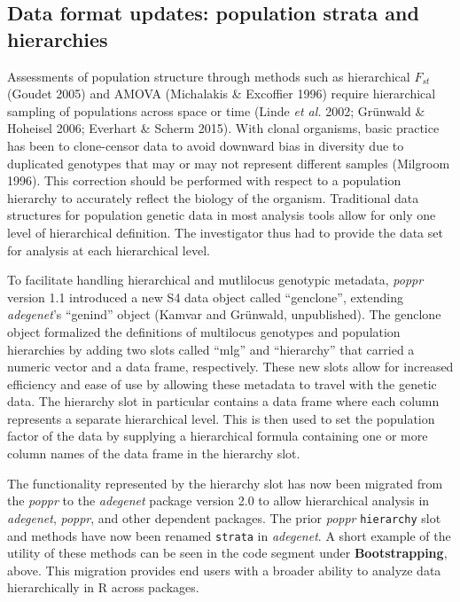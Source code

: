\documentclass[double,12pt]{beavtex}
\begin{document}
  \subsection{Data format updates: population strata and
  hierarchies}\label{data-format-updates-population-strata-and-hierarchies}
  
  Assessments of population structure through methods such as hierarchical
  \(F_{st}\) (Goudet 2005) and AMOVA (Michalakis \& Excoffier 1996)
  require hierarchical sampling of populations across space or time (Linde
  \emph{et al.} 2002; Grünwald \& Hoheisel 2006; Everhart \& Scherm 2015).
  With clonal organisms, basic practice has been to clone-censor data to
  avoid downward bias in diversity due to duplicated genotypes that may or
  may not represent different samples (Milgroom 1996). This correction
  should be performed with respect to a population hierarchy to accurately
  reflect the biology of the organism. Traditional data structures for
  population genetic data in most analysis tools allow for only one level
  of hierarchical definition. The investigator thus had to provide the
  data set for analysis at each hierarchical level.
  
  To facilitate handling hierarchical and mutlilocus genotypic metadata,
  \emph{poppr} version 1.1 introduced a new S4 data object called
  ``genclone'', extending \emph{adegenet}'s ``genind'' object (Kamvar and
  Grünwald, unpublished). The genclone object formalized the definitions
  of multilocus genotypes and population hierarchies by adding two slots
  called ``mlg'' and ``hierarchy'' that carried a numeric vector and a
  data frame, respectively. These new slots allow for increased efficiency
  and ease of use by allowing these metadata to travel with the genetic
  data. The hierarchy slot in particular contains a data frame where each
  column represents a separate hierarchical level. This is then used to
  set the population factor of the data by supplying a hierarchical
  formula containing one or more column names of the data frame in the
  hierarchy slot.
  
  The functionality represented by the hierarchy slot has now been
  migrated from the \emph{poppr} to the \emph{adegenet} package version
  2.0 to allow hierarchical analysis in \emph{adegenet}, \emph{poppr}, and
  other dependent packages. The prior \emph{poppr} \texttt{hierarchy} slot
  and methods have now been renamed \texttt{strata} in \emph{adegenet}. A
  short example of the utility of these methods can be seen in the code
  segment under \textbf{Bootstrapping}, above. This migration provides end
  users with a broader ability to analyze data hierarchically in R across
  packages.
  
\end{document}
